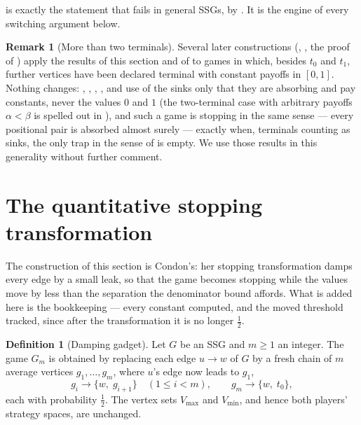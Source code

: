 \documentclass[11pt]{article}
\theoremstyle{plain}
\theoremstyle{definition}
\newtheorem{definition}[theorem]{Definition}
\newtheorem{remark}[theorem]{Remark}
\newcommand{\Vmax}{V_{\max}}
\newcommand{\Vmin}{V_{\min}}
\begin{document}
 is exactly the statement that fails in general
SSGs, by . It is the engine of every switching
argument below.

\begin{remark}[More than two terminals]\label{rem:terminals}
Several later constructions (, , the
proof of ) apply the results of this section
and of  to games in which, besides $t_0$ and $t_1$,
further vertices have been declared terminal with constant payoffs in
$[0,1]$. Nothing changes: , ,
, ,
 and  use of the sinks only
that they are absorbing and pay constants, never the values $0$ and $1$
(the two-terminal case with arbitrary payoffs $\alpha<\beta$ is spelled
out in ), and such a game is stopping in the
same sense --- every positional pair is absorbed almost surely ---
exactly when, terminals counting as sinks, the only trap in the sense of
 is empty. We use those results in this generality
without further comment.
\end{remark}

\section{The quantitative stopping transformation}\label{sec:transform}

The construction of this section is Condon's: her stopping transformation
damps every edge by a small leak, so that the game becomes stopping while
the values move by less than the separation the denominator bound affords.
What is added here is the bookkeeping --- every constant computed, and the
moved threshold tracked, since after the transformation it is no longer
$\tfrac12$.

\begin{definition}[Damping gadget]\label{def:damping}
Let $G$ be an SSG and $m\ge1$ an integer. The game $G_m$ is obtained by
replacing each edge $u\to w$ of $G$ by a fresh chain of $m$ average
vertices $g_1,\dots,g_m$, where $u$'s edge now leads to $g_1$,
\[
  g_i \longrightarrow \bigl\{w,\;g_{i+1}\bigr\}\quad (1\le i<m),
  \qquad
  g_m \longrightarrow \bigl\{w,\;t_0\bigr\},
\]
each with probability $\tfrac12$. The vertex sets $\Vmax$ and $\Vmin$,
and hence both players' strategy spaces, are unchanged.
\end{definition}
\end{document}
